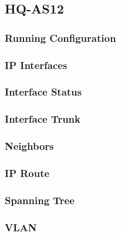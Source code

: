 \subsection{HQ-AS12}
\subsubsection{Running Configuration}


\subsubsection{IP Interfaces}


\subsubsection{Interface Status}


\subsubsection{Interface Trunk}


\subsubsection{Neighbors}


\subsubsection{IP Route}


\subsubsection{Spanning Tree}


\subsubsection{VLAN}




